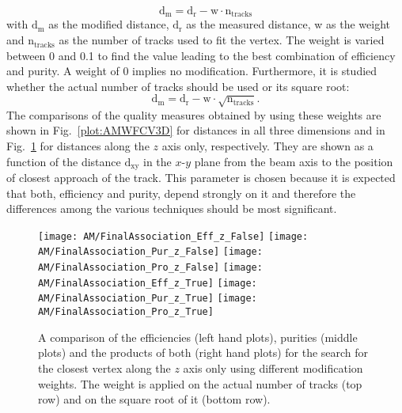\begin{displaymath}
    \textrm{d}_{\textrm{m}} = \textrm{d}_{\textrm{r}}- \textrm{w} \cdot \textrm{n}_{\textrm{tracks}}
\end{displaymath}
with $\textrm{d}_{\textrm{m}}$ as the modified distance, $\textrm{d}_{\textrm{r}}$ as the measured distance, w as the weight and $\textrm{n}_{\textrm{tracks}}$ as the number of tracks used to fit the vertex. The weight is varied between 0 and 0.1 to find the value leading to the best combination of efficiency and purity. A weight of 0 implies no modification. Furthermore, it is studied whether the actual number of tracks should be used or its square root:
\begin{displaymath}
    \textrm{d}_{\textrm{m}} = \textrm{d}_{\textrm{r}}- \textrm{w} \cdot \sqrt{\textrm{n}_{\textrm{tracks}}}.
\end{displaymath}
The comparisons of the quality measures obtained by using these weights are shown in Fig.~\ref{plot:AMWFCV3D} for distances in all three dimensions and in Fig.~\ref{plot:AMWFCVZ} for distances along the $z$ axis only, respectively. They are shown as a function of the distance $\textrm{d}_{\textrm{xy}}$ in the $x$-$y$ plane from the beam axis to the position of closest approach of the track. This parameter is chosen because it is expected that both, efficiency and purity, depend strongly on it and therefore the differences among the various techniques should be most significant.

\begin{figure}[!ht]
    \centering
    \texttt{[image: AM/FinalAssociation\_Eff\_z\_False]}
    \texttt{[image: AM/FinalAssociation\_Pur\_z\_False]}
    \texttt{[image: AM/FinalAssociation\_Pro\_z\_False]}
    \newline
    \texttt{[image: AM/FinalAssociation\_Eff\_z\_True]}
    \texttt{[image: AM/FinalAssociation\_Pur\_z\_True]}
    \texttt{[image: AM/FinalAssociation\_Pro\_z\_True]}
    \caption[Efficiency, purity and their product using different modification weights for the search along $z$ axis only.]{A comparison of the efficiencies (left hand plots), purities (middle plots) and the products of both (right hand plots) for the search for the closest vertex along the $z$ axis only using different modification weights. The weight is applied on the actual number of tracks (top row) and on the square root of it (bottom row).\label{plot:AMWFCVZ}}
\end{figure}

